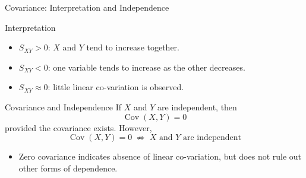\documentclass{beamer}
\begin{document}

\begin{frame}{Covariance: Interpretation and Independence}

\begin{block}{Interpretation}
\begin{itemize}
    \item $S_{XY}>0$: $X$ and $Y$ tend to increase together.
    \item $S_{XY}<0$: one variable tends to increase as the other decreases.
    \item $S_{XY}\approx0$: little linear co-variation is observed.
\end{itemize}
\end{block}

\begin{block}{Covariance and Independence}
If $X$ and $Y$ are independent, then
\[
\boxed{\operatorname{Cov}(X,Y)=0}
\]
provided the covariance exists. However,
\[
\boxed{\operatorname{Cov}(X,Y)=0
\;\not\Rightarrow\;
X\text{ and }Y\text{ are independent}}
\]

\end{block}

\begin{itemize}
    \item Zero covariance indicates absence of linear co-variation,
          but does not rule out other forms of dependence.
\end{itemize}

\end{frame}

\end{document}
